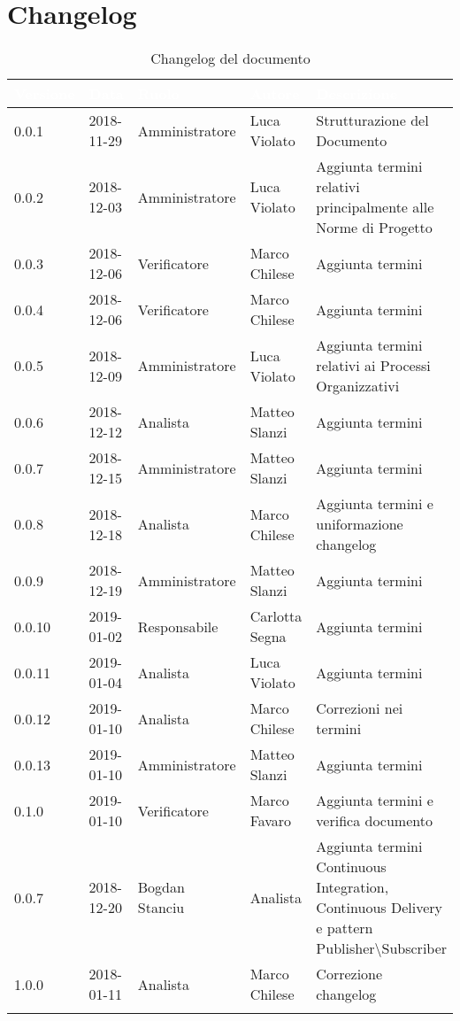 \section*{Changelog}

\begin{center}
\begin{longtable}[c]{|m{}|m{}|m{}|m{}|p{}|}
\hline
\rowcolor{bluelogo}\textbf{\textcolor{white}{Versione}} & \textbf{\textcolor{white}{Data}} & \textbf{\textcolor{white}{Ruolo}} & \textbf{\textcolor{white}{Autore}} & \textbf{\textcolor{white}{Descrizione}} \\
\hline \hline
\endhead
0.0.1 & 2018-11-29  &Amministratore & Luca Violato & Strutturazione del Documento \\
\hline
\rowcolor{grigio}0.0.2 & 2018-12-03 & Amministratore & Luca Violato & Aggiunta termini relativi principalmente alle Norme di Progetto \\
\hline
0.0.3 & 2018-12-06 & Verificatore  & Marco Chilese & Aggiunta termini\\
\hline 
\rowcolor{grigio}0.0.4 & 2018-12-06 & Verificatore & Marco Chilese & Aggiunta termini\\
\hline
0.0.5 & 2018-12-09 & Amministratore & Luca Violato & Aggiunta termini relativi ai Processi Organizzativi\\
\hline
\rowcolor{grigio}0.0.6 & 2018-12-12 & Analista & Matteo Slanzi & Aggiunta termini\\
\hline
0.0.7 & 2018-12-15 & Amministratore & Matteo Slanzi & Aggiunta termini\\
\hline
\rowcolor{grigio}0.0.8 & 2018-12-18 & Analista & Marco Chilese & Aggiunta termini e uniformazione changelog\\
\hline
0.0.9 & 2018-12-19 & Amministratore & Matteo Slanzi & Aggiunta termini\\
\hline
\rowcolor{grigio} 0.0.10 & 2019-01-02 & Responsabile & Carlotta Segna & Aggiunta termini\\
\hline
0.0.11 & 2019-01-04 & Analista & Luca Violato & Aggiunta termini\\
\hline
\rowcolor{grigio}0.0.12 & 2019-01-10 & Analista & Marco Chilese & Correzioni nei termini\\
\hline
0.0.13 & 2019-01-10 & Amministratore & Matteo Slanzi & Aggiunta termini\\
\hline
\rowcolor{grigio}0.1.0 & 2019-01-10 & Verificatore & Marco Favaro & Aggiunta termini e verifica documento\\
\hline
0.0.7 & 2018-12-20 & Bogdan Stanciu & Analista & Aggiunta termini Continuous Integration, Continuous Delivery e pattern Publisher\textbackslash Subscriber\\
\hline
\rowcolor{grigio}1.0.0 & 2018-01-11 & Analista & Marco Chilese & Correzione changelog\\
\hline
\caption{Changelog del documento}
\end{longtable}
\end{center}